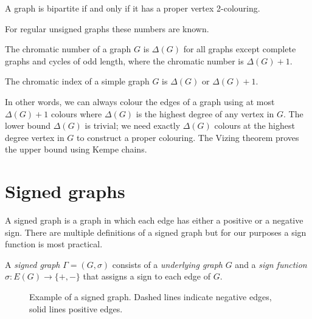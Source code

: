 \begin{theorem}\label{th:bipartite}
    A graph is bipartite if and only if it has a proper vertex 2-colouring.
\end{theorem}

For regular unsigned graphs these numbers are known.

\begin{theorem}
    The chromatic number of a graph $G$ is $\Delta(G)$ for all graphs except complete graphs and cycles of odd length, where the chromatic number is $\Delta(G) + 1$.
\end{theorem}

\begin{theorem}[Vizing]
    The chromatic index of a simple graph $G$ is $\Delta(G)$ or $\Delta(G) + 1$.
\end{theorem}

In other words, we can always colour the edges of a graph using at most $\Delta(G) + 1$ colours where $\Delta(G)$ is the highest degree of any vertex in $G$. The lower bound $\Delta(G)$ is trivial; we need exactly $\Delta(G)$ colours at the highest degree vertex in $G$ to construct a proper colouring. The Vizing theorem proves the upper bound using Kempe chains.

\section{Signed graphs}

A signed graph is a graph in which each edge has either a positive or a negative sign. There are multiple definitions of a signed graph but for our purposes a sign function is most practical.

\begin{definition}
    A \textit{signed graph} $\Gamma = (G, \sigma)$ consists of a \textit{underlying graph} $G$ and a \textit{sign function} $\sigma : E(G) \rightarrow \{+,-\}$ that assigns a sign to each edge of $G$.
\end{definition}

\begin{figure}[h]
    \centering
    \caption[Example of a signed graph]{Example of a signed graph. Dashed lines indicate negative edges, solid lines positive edges.}
\end{figure}

